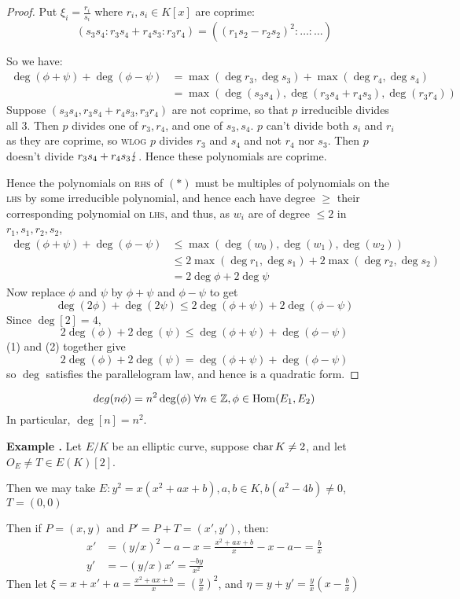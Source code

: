 \documentclass[10pt,a4paper]{article}
\begin{document}
\begin{proof}
Put $\xi_i = \frac{r_i}{s_i}$ where $r_i, s_i \in K[x]$ are coprime:
\[(s_3 s_4:r_3 s_4+r_4 s_3:r_3 r_4) = ((r_1 s_2-r_2 s_2)^2:\ldots:\ldots)\tag{$\ast$}\]

So we have:
\begin{align*}
  \deg(\phi+\psi)+\deg(\phi-\psi) &= \max(\deg r_3, \deg s_3)+\max(\deg r_4, \deg s_4) \\
  &= \max(\deg(s_3s_4), \deg(r_3s_4+r_4s_3), \deg(r_3r_4))
\end{align*}
Suppose $(s_3s_4, r_3s_4+r_4s_3, r_3r_4)$ are not coprime, so that $p$ irreducible divides all $3$. Then $p$ divides one of $r_3, r_4$, and one of $s_3, s_4$. $p$ can't divide both $s_i$ and $r_i$ as they are coprime, so \textsc{wlog} $p$ divides $r_3$ and $s_4$ and not $r_4$ nor $s_3$. Then $p$ doesn't divide $r_3s_4+r_4s_3 \lightning$. Hence these polynomials are coprime.

Hence the polynomials on \textsc{rhs} of $(\ast)$ must be multiples of polynomials on the \textsc{lhs} by some irreducible polynomial, and hence each have degree $\geq$ their corresponding polynomial on \textsc{lhs}, and thus, as $w_i$ are of degree $\leq 2$ in $r_1, s_1, r_2, s_2$,
\begin{align*}
  \deg(\phi+\psi)+\deg(\phi-\psi) &\leq \max(\deg(w_0), \deg(w_1), \deg(w_2))\\
  &\leq 2\max(\deg r_1, \deg s_1) + 2\max(\deg r_2, \deg s_2)\\
  &= 2 \deg \phi + 2 \deg \psi\tag{1}
\end{align*}
Now replace $\phi$ and $\psi$ by $\phi+\psi$ and $\phi-\psi$ to get
\[\deg(2\phi)+\deg(2\psi) \leq 2\deg(\phi+\psi)+2\deg(\phi-\psi)\]
Since $\deg[2] = 4$,
\[2\deg(\phi)+2\deg(\psi) \leq \deg(\phi+\psi)+\deg(\phi-\psi)\tag{2}\]
(1) and (2) together give
\[ 2\deg(\phi)+2\deg(\psi) = \deg(\phi+\psi)+\deg(\phi-\psi)\]
so $\deg$ satisfies the parallelogram law, and hence is a quadratic form.
\end{proof}
\begin{corollary}
  \[deg(n\phi) = n^2\deg(\phi) \forall n\in \Z, \phi \in \Hom(E_1, E_2)\]
  In particular, $\deg[n] = n^2$.
\end{corollary}
\textbf{Example \thetheorem.} Let $E/K$ be an elliptic curve, suppose $\operatorname{char} K \neq 2$, and let $O_E \neq T \in E(K)[2]$.

Then we may take $E: y^2 = x(x^2+ax+b), a, b \in K, b(a^2-4b) \neq 0$, $T=(0, 0)$

Then if $P=(x,y)$ and $P'=P+T = (x', y')$, then:
\begin{align*}
  x' &= (y/x)^2 - a - x = \frac{x^2+ax+b}{x}-x-a- = \frac{b}{x}\\
  y' &= -(y/x)x' = \frac{-by}{x^2}
\end{align*}
Then let $\xi = x+x'+a = \frac{x^2+ax+b}{x} = \left(\frac{y}{x}\right)^2$, and $\eta = y+y' = \frac{y}{x}(x-\frac{b}{x})$
\end{document}
